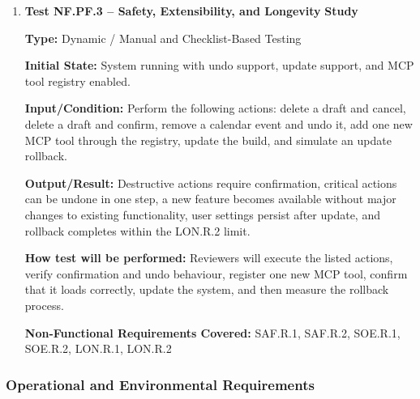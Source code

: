 \documentclass[12pt, titlepage]{article}
\begin{document}
\begin{enumerate}
\textbf{How test will be performed:} Reviewers will trigger each listed
failure condition, inspect logs and on-screen errors, monitor whether
the system remains usable, and record runtime and CPU usage during the
continuous run.

\textbf{Non-Functional Requirements Covered:} ROFT.R.1, ROFT.R.2,
CAP.R.1, CAP.R.2

\item \textbf{Test NF.PF.3 -- Safety, Extensibility, and Longevity}
\textbf{Study}

\textbf{Type:} Dynamic / Manual and Checklist-Based Testing

\textbf{Initial State:} System running with undo support, update
support, and MCP tool registry enabled.

\textbf{Input/Condition:} Perform the following actions:
delete a draft and cancel, delete a draft and confirm, remove a
calendar event and undo it, add one new MCP tool through the registry,
update the build, and simulate an update rollback.

\textbf{Output/Result:} Destructive actions require confirmation,
critical actions can be undone in one step, a new feature becomes
available without major changes to existing functionality, user settings
persist after update, and rollback completes within the LON.R.2 limit.

\textbf{How test will be performed:} Reviewers will execute the listed
actions, verify confirmation and undo behaviour, register one new MCP
tool, confirm that it loads correctly, update the system, and then
measure the rollback process.

\textbf{Non-Functional Requirements Covered:} SAF.R.1, SAF.R.2,
SOE.R.1, SOE.R.2, LON.R.1, LON.R.2

\end{enumerate}

\subsubsection{Operational and Environmental Requirements}
\end{document}
